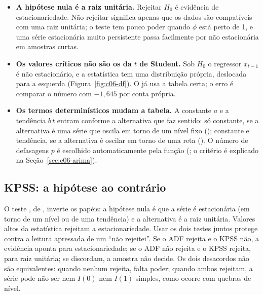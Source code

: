 \begin{itemize}
  \item \textbf{A hipótese nula é a raiz unitária.} Rejeitar $H_0$ é evidência de estacionariedade. Não rejeitar significa apenas que os dados são compatíveis com uma raiz unitária; o teste tem pouco poder quando $\phi$ está perto de 1, e uma série estacionária muito persistente passa facilmente por não estacionária em amostras curtas.
  \item \textbf{Os valores críticos não são os da $t$ de Student.} Sob $H_0$ o regressor $x_{t-1}$ é não estacionário, e a estatística tem uma distribuição própria, deslocada para a esquerda (Figura~\ref{fig:c06-df}). O  já usa a tabela certa; o erro é comparar o número com $-1,645$ por conta própria.
  \item \textbf{Os termos determinísticos mudam a tabela.} A constante $a$ e a tendência $b\,t$ entram conforme a alternativa que faz sentido: só constante, se a alternativa é uma série que oscila em torno de um nível fixo (); constante e tendência, se a alternativa é oscilar em torno de uma reta (). O número de defasagens $p$ é escolhido automaticamente pela função (; o critério é explicado na Seção~\ref{sec:c06-arima}).
\end{itemize}

\subsection{KPSS: a hipótese ao contrário}

O teste , de \citet{kwiatkowski1992}, inverte os papéis: a hipótese nula é que a série é estacionária (em torno de um nível ou de uma tendência) e a alternativa é a raiz unitária. Valores altos da estatística rejeitam a estacionariedade. Usar os dois testes juntos protege contra a leitura apressada de um ``não rejeitei''. Se o ADF rejeita e o KPSS não, a evidência aponta para estacionariedade; se o ADF não rejeita e o KPSS rejeita, para raiz unitária; se discordam, a amostra não decide. Os dois desacordos não são equivalentes: quando nenhum rejeita, falta poder; quando ambos rejeitam, a série pode não ser nem $I(0)$ nem $I(1)$ simples, como ocorre com quebras de nível.

